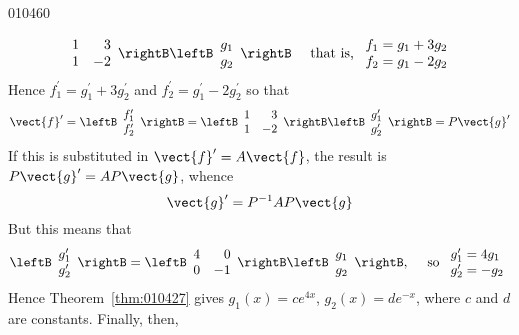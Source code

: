 \begin{example}{}{010460}
\begin{solution}
\begin{equation*}
\begin{array}{rr}
1 & 3 \\
1 & -2
\end{array}\rightB \leftB \begin{array}{c}
g_1\\
g_2
\end{array}\rightB \quad \mbox{ that is, }
\begin{array}{l}
f_1 = g_1 + 3g_2 \\
f_2 = g_1 - 2g_2 
\end{array}
\end{equation*}
Hence $f_1^{\prime} = g_1^{\prime} + 3g_2^{\prime}$ and $f_2^{\prime} = g_1^{\prime}- 2g_2^{\prime}$ so that
\begin{equation*}
\vect{f}^{\prime} = \leftB \begin{array}{c}
f_1^{\prime} \\
f_2^{\prime} \end{array}
\rightB =  \leftB \begin{array}{rr}
1 & 3 \\
1 & -2
\end{array}\rightB \leftB \begin{array}{c}
g_1^{\prime} \\
g_2^{\prime} \end{array}
\rightB = P \vect{g}^{\prime}
\end{equation*}
If this is substituted in $\vect{f}^{\prime} = A\vect{f}$, the result is $P\vect{g}^{\prime} = AP\vect{g}$, whence
\begin{equation*}
\vect{g}^{\prime} = P^{-1}AP \vect{g}
\end{equation*}
But this means that
\begin{equation*}
 \leftB \begin{array}{c}
g_1^{\prime} \\
g_2^{\prime} \end{array}
\rightB = \leftB \begin{array}{rr}
4 & 0 \\
0 & -1 
\end{array}\rightB  \leftB \begin{array}{c}
g_1 \\
g_2 \end{array}
\rightB, \quad \mbox{ so }
\begin{array}{l}
g_1^{\prime} = 4g_1 \\
g_2^{\prime} = -g_2
\end{array}
\end{equation*}
Hence Theorem~\ref{thm:010427} gives $g_{1}(x) = ce^{4x}$, $g_{2}(x) = de^{-x}$, where $c$ and $d$ are constants. Finally, then,

\end{solution}
\end{example}
